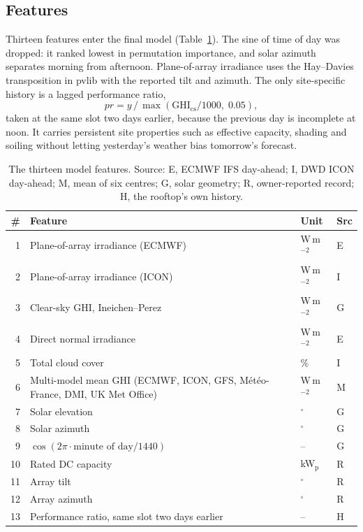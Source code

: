 \subsection{Features}
\label{sec:meth-features}

Thirteen features enter the final model (Table~\ref{tab:features}). The sine of time of day was dropped: it ranked lowest in permutation importance, and solar azimuth separates morning from afternoon. Plane-of-array irradiance uses the Hay--Davies transposition \citep{Hay1979} in pvlib \citep{Holmgren2018} with the reported tilt and azimuth. The only site-specific history is a lagged performance ratio,
\begin{equation}
pr = y \,/\, \max(\mathrm{GHI}_\mathrm{cs}/1000,\; 0.05),
\end{equation}
taken at the same slot two days earlier, because the previous day is incomplete at noon. It carries persistent site properties such as effective capacity, shading and soiling without letting yesterday's weather bias tomorrow's forecast.

\begin{table}[!htb]
\centering
\caption{The thirteen model features. Source: E, ECMWF IFS day-ahead; I, DWD ICON day-ahead; M, mean of six centres; G, solar geometry; R, owner-reported record; H, the rooftop's own history.}
\label{tab:features}
\small
\begin{tabularx}{\textwidth}{@{}r X l l@{}}
\toprule
\# & Feature & Unit & Src \\
\midrule
1 & Plane-of-array irradiance (ECMWF) & W\,m$^{-2}$ & E \\
2 & Plane-of-array irradiance (ICON) & W\,m$^{-2}$ & I \\
3 & Clear-sky GHI, Ineichen--Perez & W\,m$^{-2}$ & G \\
4 & Direct normal irradiance & W\,m$^{-2}$ & E \\
5 & Total cloud cover & \% & I \\
6 & Multi-model mean GHI (ECMWF, ICON, GFS, M\'et\'eo-France, DMI, UK Met Office) & W\,m$^{-2}$ & M \\
7 & Solar elevation & $^\circ$ & G \\
8 & Solar azimuth & $^\circ$ & G \\
9 & $\cos(2\pi \cdot \text{minute of day} / 1440)$ & -- & G \\
10 & Rated DC capacity & kW$_\mathrm{p}$ & R \\
11 & Array tilt & $^\circ$ & R \\
12 & Array azimuth & $^\circ$ & R \\
13 & Performance ratio, same slot two days earlier & -- & H \\
\bottomrule
\end{tabularx}
\end{table}

